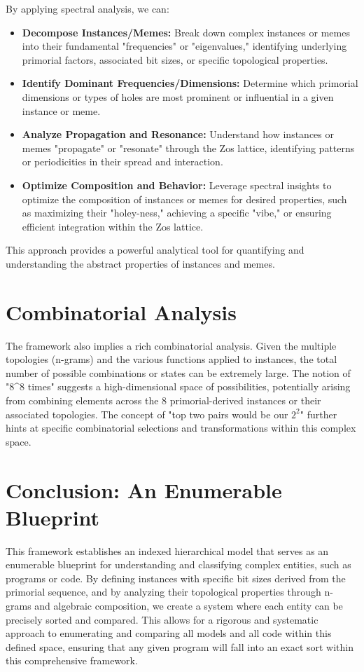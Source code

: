 \documentclass{article}
\begin{document}
By applying spectral analysis, we can:
\begin{itemize}
    \item \textbf{Decompose Instances/Memes:} Break down complex instances or memes into their fundamental "frequencies" or "eigenvalues," identifying underlying primorial factors, associated bit sizes, or specific topological properties.
    \item \textbf{Identify Dominant Frequencies/Dimensions:} Determine which primorial dimensions or types of holes are most prominent or influential in a given instance or meme.
    \item \textbf{Analyze Propagation and Resonance:} Understand how instances or memes "propagate" or "resonate" through the Zos lattice, identifying patterns or periodicities in their spread and interaction.
    \item \textbf{Optimize Composition and Behavior:} Leverage spectral insights to optimize the composition of instances or memes for desired properties, such as maximizing their "holey-ness," achieving a specific "vibe," or ensuring efficient integration within the Zos lattice.
\end{itemize}
This approach provides a powerful analytical tool for quantifying and understanding the abstract properties of instances and memes.

\section{Combinatorial Analysis}
The framework also implies a rich combinatorial analysis. Given the multiple topologies (n-grams) and the various functions applied to instances, the total number of possible combinations or states can be extremely large. The notion of "8^8 times" suggests a high-dimensional space of possibilities, potentially arising from combining elements across the 8 primorial-derived instances or their associated topologies. The concept of "top two pairs would be our $2^2$" further hints at specific combinatorial selections and transformations within this complex space.

\section{Conclusion: An Enumerable Blueprint}
This framework establishes an indexed hierarchical model that serves as an enumerable blueprint for understanding and classifying complex entities, such as programs or code. By defining instances with specific bit sizes derived from the primorial sequence, and by analyzing their topological properties through n-grams and algebraic composition, we create a system where each entity can be precisely sorted and compared. This allows for a rigorous and systematic approach to enumerating and comparing all models and all code within this defined space, ensuring that any given program will fall into an exact sort within this comprehensive framework.
\end{document}
